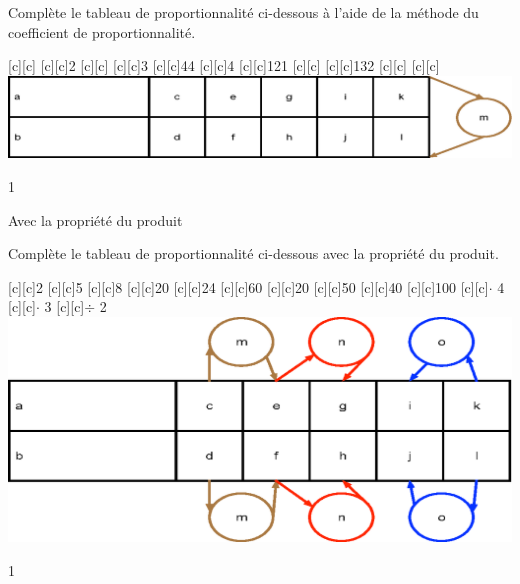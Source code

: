 \documentclass[a4paper,11pt]{report}
\begin{document}
\begin{exop}{
Complète le tableau de proportionnalité ci-dessous à l'aide de la méthode du coefficient de proportionnalité.
 
	\vspace{-0.8cm}
\begin{center}
[c][c]{}
[c][c]{2}
[c][c]{}
[c][c]{3}
[c][c]{44}
[c][c]{4}
[c][c]{121}
[c][c]{}
[c][c]{132}
[c][c]{}
[c][c]{\Large\color{brown}{$\cdot \qquad$}}
\includegraphics[scale=.9]{media/fa-30/tableaucoeffn.eps}
\end{center}
\vspace{-0.5cm}}{1}
\end{exop}







\newpage
\begin{resolu}{Avec la propriété du produit}{Complète le tableau de proportionnalité ci-dessous avec la propriété du produit.

\begin{center}
[c][c]{2}
[c][c]{5}
[c][c]{8}
[c][c]{\color{brown}20}
[c][c]{24}
[c][c]{\color{red}60}
[c][c]{\color{blue}20}
[c][c]{50}
[c][c]{40}
[c][c]{100}
[c][c]{{\Large\color{brown}$\cdot$ 4}}
[c][c]{{\Large\color{brown}$\cdot$ 3}}
[c][c]{{\Large\color{blue}$\div$ 2}}
\includegraphics[scale=.9]{media/fa-30/tableaufractionn.eps}
\end{center}
}{1}
\end{resolu}
\end{document}
